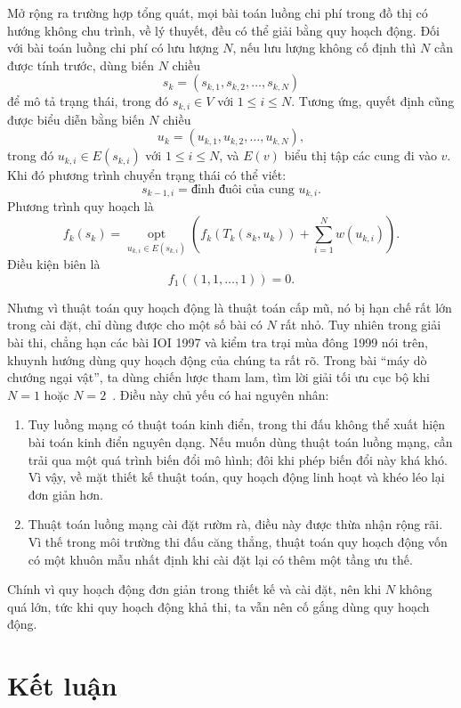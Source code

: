 \documentclass[11pt]{article}
\begin{document}
Mở rộng ra trường hợp tổng quát, mọi bài toán luồng chi phí trong đồ thị có
hướng không chu trình, về lý thuyết, đều có thể giải bằng quy hoạch động.
Đối với bài toán luồng chi phí có lưu lượng \(N\), nếu lưu lượng không cố
định thì \(N\) cần được tính trước, dùng biến \(N\) chiều
\[
  s_k=(s_{k,1},s_{k,2},\ldots,s_{k,N})
\]
để mô tả trạng thái, trong đó \(s_{k,i}\in V\) với \(1\le i\le N\). Tương ứng,
quyết định cũng được biểu diễn bằng biến \(N\) chiều
\[
  u_k=(u_{k,1},u_{k,2},\ldots,u_{k,N}),
\]
trong đó \(u_{k,i}\in E(s_{k,i})\) với \(1\le i\le N\), và \(E(v)\) biểu thị
tập các cung đi vào \(v\). Khi đó phương trình chuyển trạng thái có thể viết:
\[
  s_{k-1,i}=\text{đỉnh đuôi của cung }u_{k,i}.
\]
Phương trình quy hoạch là
\[
  f_k(s_k)=
  \operatorname*{opt}_{u_{k,i}\in E(s_{k,i})}
  \left(f_k(T_k(s_k,u_k))+\sum_{i=1}^{N} w(u_{k,i})\right).
\]
Điều kiện biên là
\[
  f_1((1,1,\ldots,1))=0.
\]

Nhưng vì thuật toán quy hoạch động là thuật toán cấp mũ, nó bị hạn chế rất
lớn trong cài đặt, chỉ dùng được cho một số bài có \(N\) rất nhỏ. Tuy nhiên
trong giải bài thi, chẳng hạn các bài IOI 1997 và kiểm tra trại mùa đông 1999
nói trên, khuynh hướng dùng quy hoạch động của chúng ta rất rõ. Trong bài
``máy dò chướng ngại vật'', ta dùng chiến lược tham lam, tìm lời giải tối ưu
cục bộ khi \(N=1\) hoặc \(N=2\)~\cite{detector-solution}. Điều này chủ yếu có
hai nguyên nhân:

\begin{enumerate}
  \item Tuy luồng mạng có thuật toán kinh điển, trong thi đấu không thể xuất
  hiện bài toán kinh điển nguyên dạng. Nếu muốn dùng thuật toán luồng mạng,
  cần trải qua một quá trình biến đổi mô hình; đôi khi phép biến đổi này khá
  khó. Vì vậy, về mặt thiết kế thuật toán, quy hoạch động linh hoạt và khéo
  léo lại đơn giản hơn.

  \item Thuật toán luồng mạng cài đặt rườm rà, điều này được thừa nhận rộng
  rãi. Vì thế trong môi trường thi đấu căng thẳng, thuật toán quy hoạch động
  vốn có một khuôn mẫu nhất định khi cài đặt lại có thêm một tầng ưu thế.
\end{enumerate}

Chính vì quy hoạch động đơn giản trong thiết kế và cài đặt, nên khi \(N\)
không quá lớn, tức khi quy hoạch động khả thi, ta vẫn nên cố gắng dùng quy
hoạch động.

\section{Kết luận}
\end{document}
